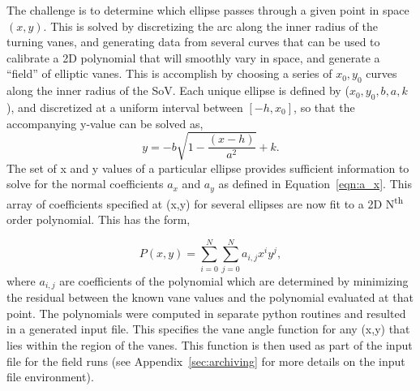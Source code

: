 The challenge is to determine which ellipse passes through 
a given point in space $(x,y)$. 
This is solved by discretizing the arc along the inner radius 
of the turning vanes, and generating data from
several curves that can be used to calibrate a 2D polynomial that will
smoothly vary in space, and generate a ``field'' of elliptic vanes. 
This is accomplish by choosing a series of
$x_0,y_0$ curves along the inner radius of the SoV. 
Each unique ellipse is defined by ($x_0,y_0,b,a,k$),
and discretized at a uniform interval between $\left[-h,x_0\right]$, 
so that the accompanying y-value can be solved as, 
\begin{equation}
 y = -b \sqrt{1-\frac{(x-h)}{a^2}} + k. 
\end{equation}
The set of x and y values of a particular ellipse 
provides sufficient information to solve for the normal coefficients
$a_x$ and $a_y$ as defined in Equation~\ref{eqn:a_x}. This array of
coefficients specified at (x,y) for several ellipses 
are now fit to a 2D N\textsuperscript{th}
order polynomial. This has the form, 

\begin{equation}
 P(x,y) = \sum_{i=0}^N  \sum_{j=0}^N a_{i,j} x^i y^j,
\end{equation}
%
where $a_{i,j}$ are coefficients of the polynomial which are 
determined by minimizing the residual between the 
known vane values and the polynomial evaluated at that point. 
The polynomials were computed in separate python routines and 
resulted in a generated input file. This specifies the vane angle
function for any (x,y) that lies within the region of the vanes. 
This function is then used as part of the input file for the 
field runs (see Appendix~\ref{sec:archiving} for 
more details on the input file environment). 
%
%


